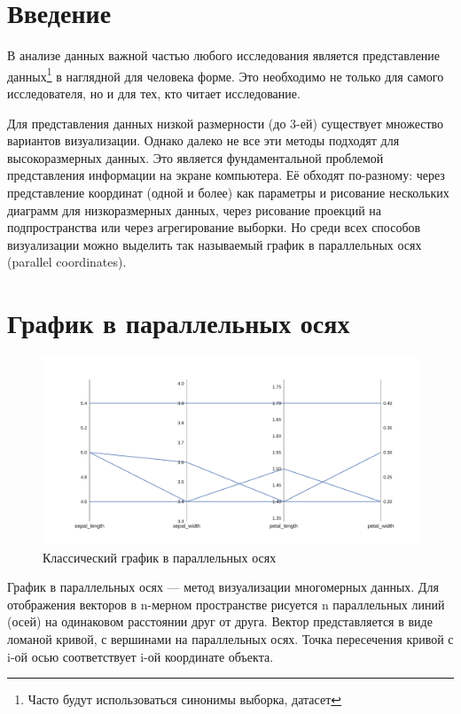 \documentclass[12pt,fleqn]{article}
\begin{document}
\section{Введение}
В анализе данных важной частью любого исследования является представление данных\footnote{
Часто будут использоваться синонимы выборка, датасет}
в наглядной для человека форме. 
Это необходимо не только для самого исследователя, но и для тех, кто читает исследование.

Для представления данных низкой размерности (до 3-ей) существует множество
вариантов визуализации. Однако далеко не все эти методы подходят для
высокоразмерных данных. Это является фундаментальной проблемой
представления информации на экране компьютера.
Её обходят по-разному: через представление координат (одной и более) как параметры и рисование нескольких
диаграмм для низкоразмерных данных, через рисование проекций на подпространства или через агрегирование
выборки. Но среди всех способов визуализации можно выделить так называемый график в
параллельных осях (parallel coordinates).

\newpage

\section{График в параллельных осях}

\begin{figure}[htb]
    \centering
    \includegraphics[width=15cm]{classic_pc.pdf}
    \caption{Классический график в параллельных осях}
    \label{classic_pc}
\end{figure}

График в параллельных осях --- метод визуализации многомерных данных.
Для отображения векторов в n-мерном пространстве рисуется n параллельных линий (осей) на одинаковом
расстоянии друг от друга. 
Вектор представляется в виде ломаной кривой, с вершинами на параллельных осях. Точка пересечения
кривой с i-ой осью соответствует i-ой координате объекта.\cite{inselberg_1985}
\end{document}
